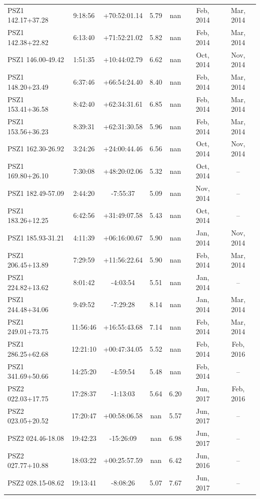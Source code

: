 \documentclass[apj, revtex4]{emulateapj}
\begin{document}
\begin{longtable*}{lcccccc}
PSZ1 142.17+37.28 & 9:18:56 & +70:52:01.14 & 5.79 & nan & Feb, 2014 & Mar, 2014\\
PSZ1 142.38+22.82 & 6:13:40 & +71:52:21.02 & 5.82 & nan & Feb, 2014 & Mar, 2014\\
PSZ1 146.00-49.42 & 1:51:35 & +10:44:02.79 & 6.62 & nan & Oct, 2014 & Nov, 2014\\
PSZ1 148.20+23.49 & 6:37:46 & +66:54:24.40 & 8.40 & nan & Feb, 2014 & Mar, 2014\\
PSZ1 153.41+36.58 & 8:42:40 & +62:34:31.61 & 6.85 & nan & Feb, 2014 & Mar, 2014\\
PSZ1 153.56+36.23 & 8:39:31 & +62:31:30.58 & 5.96 & nan & Feb, 2014 & Mar, 2014\\
PSZ1 162.30-26.92 & 3:24:26 & +24:00:44.46 & 6.56 & nan & Oct, 2014 & Nov, 2014\\
PSZ1 169.80+26.10 & 7:30:08 & +48:20:02.06 & 5.32 & nan & Oct, 2014 & --\\
PSZ1 182.49-57.09 & 2:44:20 & -7:55:37 & 5.09 & nan & Nov, 2014 & --\\
PSZ1 183.26+12.25 & 6:42:56 & +31:49:07.58 & 5.43 & nan & Oct, 2014 & --\\
PSZ1 185.93-31.21 & 4:11:39 & +06:16:00.67 & 5.90 & nan & Jan, 2014 & Nov, 2014\\
PSZ1 206.45+13.89 & 7:29:59 & +11:56:22.64 & 5.90 & nan & Feb, 2014 & Mar, 2014\\
PSZ1 224.82+13.62 & 8:01:42 & -4:03:54 & 5.51 & nan & Jan, 2014 & --\\
PSZ1 244.48+34.06 & 9:49:52 & -7:29:28 & 8.14 & nan & Jan, 2014 & Mar, 2014\\
PSZ1 249.01+73.75 & 11:56:46 & +16:55:43.68 & 7.14 & nan & Feb, 2014 & Mar, 2014\\
PSZ1 286.25+62.68 & 12:21:10 & +00:47:34.05 & 5.52 & nan & Feb, 2014 & Feb, 2016\\
PSZ1 341.69+50.66 & 14:25:20 & -4:59:54 & 5.48 & nan & Feb, 2014 & --\\
PSZ2 022.03+17.75 & 17:28:37 & -1:13:03 & 5.64 & 6.20 & Jun, 2017 & Feb, 2016\\
PSZ2 023.05+20.52 & 17:20:47 & +00:58:06.58 & nan & 5.57 & Jun, 2017 & --\\
PSZ2 024.46-18.08 & 19:42:23 & -15:26:09 & nan & 6.98 & Jun, 2017 & --\\
PSZ2 027.77+10.88 & 18:03:22 & +00:25:57.59 & nan & 6.42 & Jun, 2016 & --\\
PSZ2 028.15-08.62 & 19:13:41 & -8:08:26 & 5.07 & 7.67 & Jun, 2017 & --\\

\end{longtable*}
\end{document}
